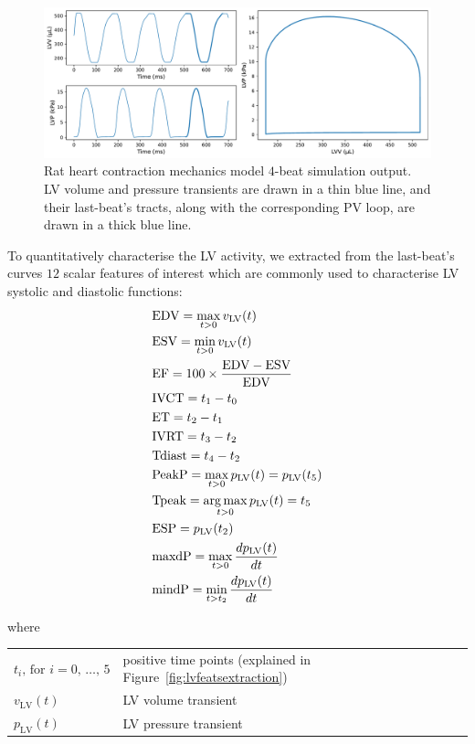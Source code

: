 \begin{figure}[!ht]
    \myfloatalign
    \includegraphics[width=\textwidth]{figures/chapter03/a_typical_model_output.pdf}
    \caption{Rat heart contraction mechanics model $4$-beat simulation output. LV volume and pressure transients are drawn in a thin blue line, and their last-beat's tracts, along with the corresponding PV loop, are drawn in a thick blue line.}
    \label{fig:examplepvloop}
\end{figure}

\vspace{0.2cm}
To quantitatively characterise the LV activity, we extracted from the last-beat's curves $12$ scalar features of interest which are commonly used to characterise LV systolic and diastolic functions:
%
\begin{align}
    &\text{EDV}= \max_{t>0}{v_{\textrm{LV}}(t)} \\
    &\text{ESV}= \min_{t>0}{v_{\textrm{LV}}(t)} \\
    &\text{EF}= 100\times\frac{\text{EDV}-\text{ESV}}{\text{EDV}} \\
    &\text{IVCT}= t_1-t_0 \\
    &\text{ET}= t_2-t_1 \\
    &\text{IVRT}= t_3-t_2 \\
    &\text{Tdiast}= t_4-t_2 \\
    &\text{PeakP}= \max_{t>0}{p_{\textrm{LV}}(t)} = p_{\textrm{LV}}(t_5) \\
    &\text{Tpeak}= \operatorname*{arg\,max}_{t>0}{p_{\textrm{LV}}(t)} = t_5 \\
    &\text{ESP}= p_{\textrm{LV}}(t_2) \\
    &\text{maxdP}= \max_{t>0}{\frac{dp_{\textrm{LV}}(t)}{dt}} \\
    &\text{mindP}= \min_{t>t_2}{\frac{dp_{\textrm{LV}}(t)}{dt}}
\end{align}

\noindent
where

\vspace{0.2cm}
\begin{tabular}{ll}
    $t_i,\,\text{for}\,\,i=0,\,\dots,\,5$ & positive time points (explained in Figure~\ref{fig:lvfeatsextraction}) \\
    $v_{\textrm{LV}}(t)$ & LV volume transient \\
    $p_{\textrm{LV}}(t)$ & LV pressure transient
\end{tabular}

